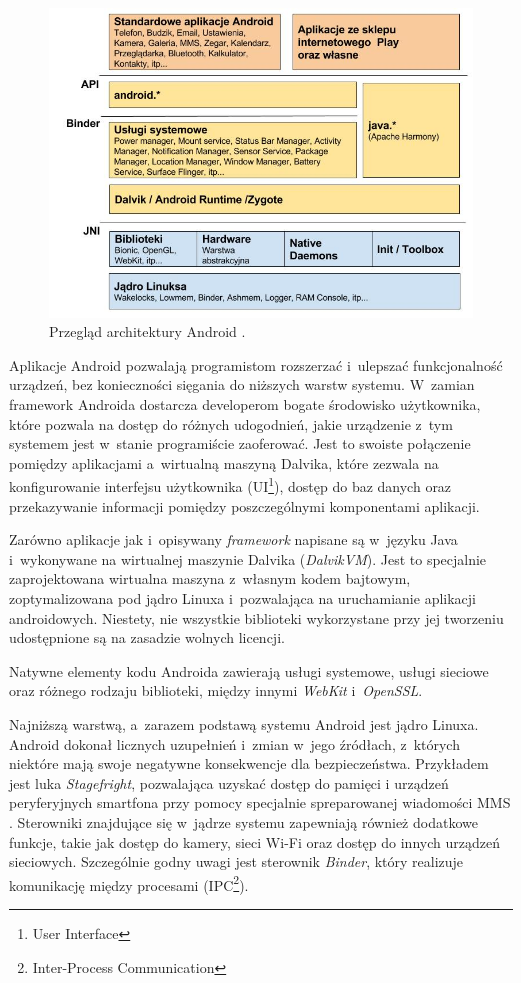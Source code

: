\begin{figure}[!htb]
    \centering
    \includegraphics[width=13cm]{imgs/ch3_android_architecture_1.jpg}
    \caption
{Przegląd architektury Android \cite{website:android:przegladarchitektury}.}
    \label{fig:ch3_android_architecture_1}
\end{figure} 

Aplikacje Android pozwalają programistom rozszerzać i~ulepszać funkcjonalność urządzeń, bez konieczności sięgania do niższych warstw systemu. W~zamian framework Androida dostarcza developerom bogate środowisko użytkownika, które pozwala na dostęp do różnych udogodnień, jakie urządzenie z~tym systemem jest w~stanie programiście zaoferować. Jest to swoiste połączenie pomiędzy aplikacjami a~wirtualną maszyną Dalvika, które zezwala na konfigurowanie interfejsu użytkownika (UI\footnote{User Interface}), dostęp do baz danych oraz przekazywanie informacji pomiędzy poszczególnymi komponentami aplikacji.

Zarówno aplikacje jak i~opisywany \textit{framework} napisane są w~języku Java i~wykonywane na wirtualnej maszynie Dalvika (\textit{DalvikVM}). Jest to specjalnie zaprojektowana wirtualna maszyna z~własnym kodem bajtowym, zoptymalizowana pod jądro Linuxa i~pozwalająca na uruchamianie aplikacji androidowych. Niestety, nie wszystkie biblioteki wykorzystane przy jej tworzeniu udostępnione są na zasadzie wolnych licencji.

Natywne elementy kodu Androida zawierają usługi systemowe, usługi sieciowe oraz różnego rodzaju biblioteki, między innymi \textit{WebKit} i~\textit{OpenSSL}. 

Najniższą warstwą, a~zarazem podstawą systemu Android jest jądro Linuxa. Android dokonał licznych uzupełnień i~zmian w~jego źródłach, z~których niektóre mają swoje negatywne konsekwencje dla bezpieczeństwa. Przykładem jest luka \textit{Stagefright}, pozwalająca uzyskać dostęp do pamięci i urządzeń peryferyjnych smartfona przy pomocy specjalnie spreparowanej wiadomości MMS \cite{website:android:bezpieczenstwo}. Sterowniki znajdujące się w~jądrze systemu zapewniają również dodatkowe funkcje, takie jak dostęp do kamery, sieci Wi-Fi oraz dostęp do innych urządzeń sieciowych. Szczególnie godny uwagi jest sterownik \textit{Binder}, który realizuje komunikację między procesami \cite{bib:hacker:handbook} (IPC\footnote{Inter-Process Communication}).

